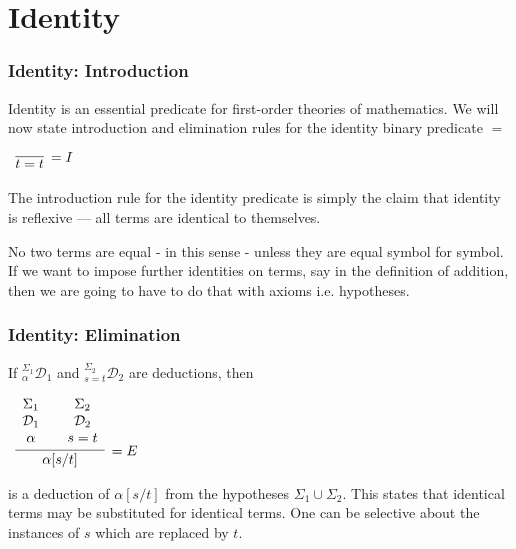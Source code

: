 \documentclass{beamer}
\theoremstyle{indentDefn} \newtheorem{defn}[]{Definition}
\begin{document}
\section{Identity}

\begin{frame}
	\frametitle{Identity: Introduction}

	Identity is an essential predicate for first-order theories of mathematics. We will now state introduction and elimination rules for the identity binary predicate $=$ 

	\vspace{0.2cm}

	\begin{center}
		$\begin{array}{c}
			\infer[= I]{t = t}
				{}
		\end{array}$
	\end{center}

	\vspace{0.2cm}

	The introduction rule for the identity predicate is simply the claim that identity is reflexive --- all terms are identical to themselves. 

	\vspace{0.2cm}

	No two terms are equal - in this sense - unless they are equal symbol for symbol. If we want to impose further identities on terms, say in the definition of addition, then we are going to have to do that with axioms i.e. hypotheses. 
\end{frame}

\begin{frame}
	\frametitle{Identity: Elimination}

	If $^{\Sigma_{1}}_{\alpha}\mathcal{D}_{1}$ and $^{\Sigma_{2}}_{s=t}\mathcal{D}_{2}$ are deductions, then

	\begin{center}
		$\begin{array}{c}
			\infer[= E]{\alpha[s/t]}
				{\begin{array}{c} \Sigma_{1} \\ \mathcal{D}_{1} \\ \alpha \end{array}
				&
				\begin{array}{c} \Sigma_{2} \\ \mathcal{D}_{2} \\ s = t \end{array}}			
		\end{array}$
	\end{center}

	is a deduction of $\alpha[s/t]$ from the hypotheses $\Sigma_{1} \cup \Sigma_{2}$. This states that identical terms may be substituted for identical terms. One can be selective about the instances of $s$ which are replaced by $t$. 

	\vspace{3cm}

\end{frame}
\end{document}
